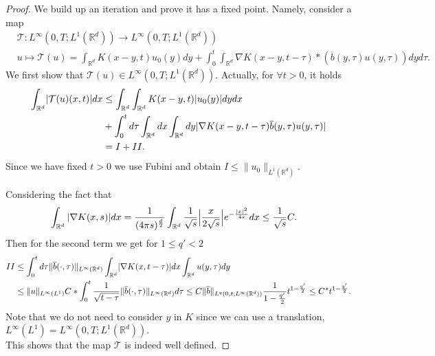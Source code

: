 \begin{proof}
 We build up an iteration and prove it has a fixed point. Namely, consider a map 
 \begin{align*}
   &\mathcal{T} : L^{\infty}(0,T;L^1(\mathbb{R}^{d} )) \to L^{\infty}(0,T;L^1(\mathbb{R}^{d} ))\\
   &u \mapsto \mathcal{T}(u) = \int_{\mathbb{R}^{d} }K(x-y,t)u_{0}(y) dy  + \int_{0}^{t} \int_{\mathbb{R}^{d} } \nabla K(x-y,t-\tau ) * (\overline{b}(y,\tau )u(y,\tau ) ) dy d\tau 
 .\end{align*}
We first show that $\mathcal{T}(u) \in  L^{\infty}(0,T;L^{1}(\mathbb{R}^{d} ) ) $. Actually, for $\forall  t >0$, it holds
 \begin{align*}
   \int_{\mathbb{R}^{d} }\lvert\mathcal{T}(u)(x,t)\rvert dx &\le \int_{\mathbb{R}^{d} } \int_{\mathbb{R}^{d} } K(x-y,t)\lvert u_0(y)\rvert dy dx \\
                                                      &+ \int_0^{t}  d\tau \int_{\mathbb{R}^{d} }dx \int_{\mathbb{R}^{d} } dy \lvert\nabla K(x-y,t-\tau )\overline{b} (y,\tau )u(y,\tau )\rvert\\
                                                      &= I + II
 .\end{align*}
  Since we have fixed $t >0$ we use Fubini and obtain $ I \le \|u_{0}\|_{L^{1}(\mathbb{R}^{d} ) }$.
  
  Considering the fact that
  \begin{align*}
    \int_{\mathbb{R}^{d} }|\nabla K(x,s)| dx  &= \frac{1}{(4 \pi s)^{\frac{d}{2}} } \int_{\mathbb{R}^{d} } \frac{1}{\sqrt{s} }\Big|\frac{x}{2 \sqrt{s} }\Big| e^{-\frac{\lvert x\rvert^2}{4s}} dx \le  \frac{1}{\sqrt{s} }C
  .\end{align*}
  Then for the second term we get for $1\leq q'<2$ 
  \begin{align*}
    II &\le \int_{0}^{t}  d\tau  \|\overline{b} (\cdot,\tau)\|_{L^{\infty}(\mathbb{R}^d) } \int_{\mathbb{R}^{d} } \lvert\nabla K(x,t-\tau )\rvert dx \int_{\mathbb{R}^{d} }u(y,\tau )dy\\
       &\le  \|u\|_{L^{\infty}(L^1) } C*\int_0^{t}  \frac{1}{\sqrt{t-\tau} }\|\overline{b} (\cdot,\tau)\|_{L^{\infty}(\mathbb{R}^d) } d\tau \leq  C\|\overline{b} \|_{L^q(0,t;L^{\infty}(\mathbb{R}^d)) }\frac{1}{1-\frac{q'}{2}}t^{1-\frac{q'}{2}}\leq C^\star t^{1-\frac{q'}{2}}
  .\end{align*}
  Note that we do not need to consider $y$ in $K$ since we can use a translation, $L^{\infty}(L^{1} ) = L^{\infty}(0,T;L^{1}(\mathbb{R}^{d} ) )  $. \\[1ex]
  This shows that the map $\mathcal{T}$ is indeed well defined.
  

\end{proof}
